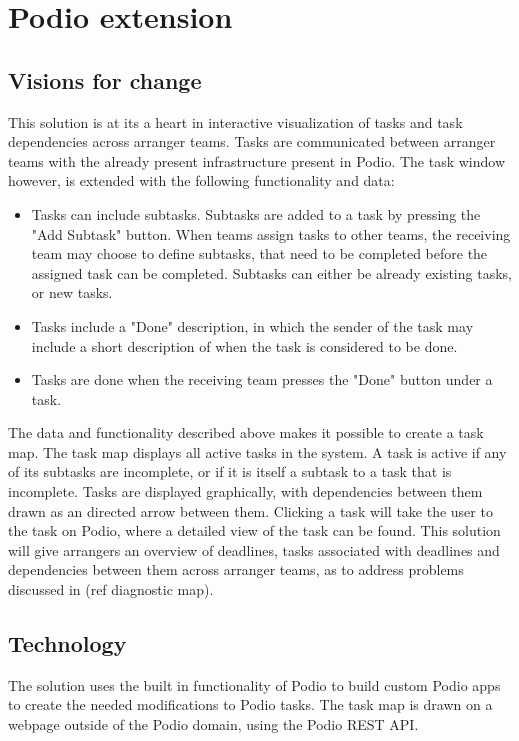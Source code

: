 \section{Podio extension}
\subsection{Visions for change}
\label{visions_for_change}
This solution is at its a heart in interactive visualization of tasks and task dependencies across arranger teams. Tasks are communicated between arranger teams with the already present infrastructure present in Podio. The task window however, is extended with the following functionality and data:
\begin{itemize}
    \item Tasks can include subtasks. Subtasks are added to a task by pressing the "Add Subtask" button. When teams assign tasks to other teams, the receiving team may choose to define subtasks, that need to be completed before the assigned task can be completed. Subtasks can either be already existing tasks, or new tasks.
    \item Tasks include a "Done" description, in which the sender of the task may include a short description of when the task is considered to be done.
    \item Tasks are done when the receiving team presses the "Done" button under a task.
\end{itemize}
The data and functionality described above makes it possible to create a task map. The task map displays all active tasks in the system. A task is active if any of its subtasks are incomplete, or if it is itself a subtask to a task that is incomplete. Tasks are displayed graphically, with dependencies between them drawn as an directed arrow between them. Clicking a task will take the user to the task on Podio, where a detailed view of the task can be found. This solution will give arrangers an overview of deadlines, tasks associated with deadlines and dependencies between them across arranger teams, as to address problems discussed in (ref diagnostic map).


\subsection{Technology}
\label{sub:technology}
The solution uses the built in functionality of Podio to build custom Podio apps to create the needed modifications to Podio tasks. The task map is drawn on a webpage outside of the Podio domain, using the Podio REST API.

